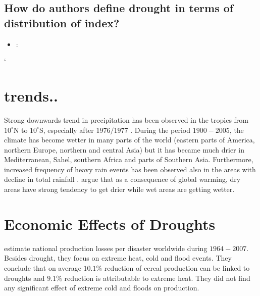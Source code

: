 \documentclass[a4paper,12pt]{article}
\begin{document}
\subsection*{How do authors define drought in terms of distribution of index?}
\begin{itemize}

\item \cite{Trenberth2014}:
\end{itemize}`

\section*{trends..}

 Strong downwards trend in precipitation has been observed in the tropics from $10^\circ$N to $10^\circ$S, especially after $1976/1977$ \citep{IPCCtrenberth}. During the period $1900-2005$, the climate has become wetter in many parts of the world (eastern parts of America, northern Europe, northern and central Asia) but it has became much drier in Mediterranean, Sahel, southern Africa and parts of Southern Asia. Furthermore, increased frequency of heavy rain events has been observed also in the areas with decline in total rainfall \citep{IPCCtrenberth}. \cite{Trenberth2014} argue that as a consequence of global warming, dry areas have strong tendency to get drier while wet areas are getting wetter.
 
 \section*{Economic Effects of Droughts}
 
\cite{Pedram2016} estimate national production losses per disaster worldwide during $1964-2007$. Besides drought, they focus on extreme heat, cold and flood events. They conclude that on average $10.1\%$ reduction of cereal production can be linked to droughts and $9.1\%$ reduction is attributable to extreme heat. They did not find any significant effect of extreme cold and floods on production.  


\end{document}
